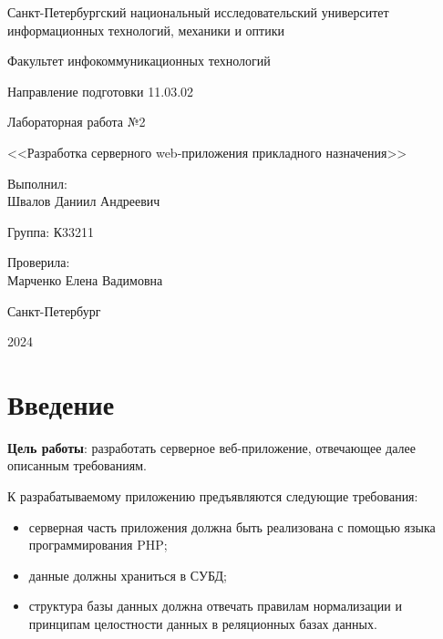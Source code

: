\documentclass[a4paper, 14pt]{extarticle}
\begin{document}
\begin{titlepage}
  \vspace{0pt plus2fill}
  \noindent

  \vspace{0pt plus6fill}
  \begin{center}
    Санкт-Петербургский национальный исследовательский университет
    информационных технологий, механики и оптики

    \vspace{0pt plus3fill}

    Факультет инфокоммуникационных технологий

    Направление подготовки 11.03.02

    \vspace{0pt plus2fill}

    Лабораторная работа №2

    <<Разработка серверного web-приложения прикладного назначения>>

  \end{center}

  \vspace{0pt plus6fill}
  \begin{flushright}
    Выполнил: \\
    Швалов Даниил Андреевич

    Группа: К33211

    Проверила: \\
    Марченко Елена Вадимовна
  \end{flushright}

  \vspace{0pt plus5fill}
  \begin{center}
    Санкт-Петербург

    2024
  \end{center}
\end{titlepage}

\section{Введение}

\textbf{Цель работы}: разработать серверное веб-приложение, отвечающее далее
описанным требованиям.

К разрабатываемому приложению предъявляются следующие требования:
\begin{itemize}
  \item серверная часть приложения должна быть реализована с помощью языка
  программирования PHP;
  \item данные должны храниться в СУБД;
  \item структура базы данных должна отвечать правилам нормализации и принципам
  целостности данных в реляционных базах данных.
\end{itemize}
\end{document}
